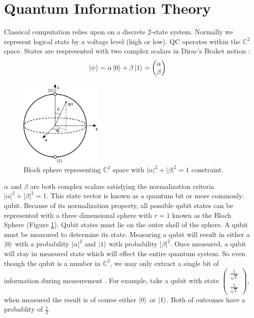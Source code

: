 \documentclass[conference]{IEEEtran}
\begin{document}
\section{Quantum Information Theory}

Classical computation relies upon on a discrete 2-state system. Normally we represent logical state by a voltage level (high or low). QC operates within the $\mathbb{C}^2$ space. States are respresented with two complex scalars in Dirac's Braket notion \cite{b1}:
\begin{equation*}
\ket{\psi} = \alpha\ket{0} + \beta\ket{1} = \begin{pmatrix}
	\alpha\\
	\beta
	\end{pmatrix}
\end{equation*}

\begin{figure}[htbp]
\centerline{\includegraphics[width=4cm]{bloch_sphere}}
\caption{Bloch sphere representing $\mathbb{C}^2$ space with $|\alpha|^2 + |\beta|^2=1$ constraint.}
\label{bloch_sphere}
\end{figure}

$\alpha$ and $\beta$ are both complex scalars satisfying the normalization criteria $|\alpha|^2 + |\beta|^2=1$. This state vector is known as a quantum bit or more commonly: qubit. Because of its normalization property, all possible qubit states can be represented with a three dimensional sphere with $r=1$ known as the Bloch Sphere (Figure \ref{bloch_sphere}). Qubit states must lie on the outer shell of the sphere. A qubit must be measured to determine its state. Measuring a qubit will result in either a $\ket{0}$ with a probability $|\alpha|^2$ and $\ket{1}$ with probability $|\beta|^2$. Once measured, a qubit will stay in measured state which will effect the entire quantum system. So even though the qubit is a number in $\mathbb{C}^2$, we may only extract a single bit of information during measurement \cite{b5}. For example, take a qubit with state $\begin{pmatrix}
	\frac{1}{\sqrt{2}}\\
	\frac{1}{\sqrt{2}}
	\end{pmatrix}$, when measured the result is of course either $\ket{0}$ or $\ket{1}$. Both of outcomes have a probablity of $\frac{1}{2}$.
\end{document}
